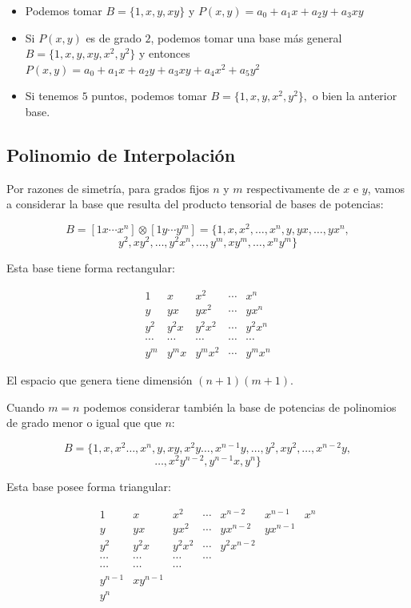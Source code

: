 \documentclass[twoside]{report}
\begin{document}
\begin{itemize}
\item Podemos tomar $B=\{1,x,y,xy\}$ y $P(x,y)=a_0+a_1x+a_2y+a_3xy$
\item Si $P(x,y)$ es de grado $2$, podemos tomar una base más general $B=\{1,x,y,xy,x^2,y^2\}$ y entonces $P(x,y)=a_0+a_1x+a_2y+a_3xy+a_4x^2+a_5y^2$
\item Si tenemos $5$ puntos, podemos tomar $B=\{1,x,y,x^2,y^2\},$ o bien la anterior base.
\end{itemize}

\subsection{Polinomio de Interpolación}

Por razones de simetría, para grados fijos $n$ y $m$ respectivamente de $x$ e $y$, vamos a considerar la base que resulta del producto tensorial de bases de potencias:

$$B=[1 x \cdots x^n]\otimes[1 y \cdots y^m]=\{1,x,x^2, \ldots, x^n, y, yx, \ldots,yx^n, $$ $$y^2, xy^2, \ldots, y^2x^n, \ldots,y^m,xy^m, \ldots,x^ny^m\}$$

Esta base tiene forma rectangular:

$$\begin{array}{ccccc}
1 & x & x^2& \cdots & x^n\\
y & yx& yx^2 & \cdots& y x^n\\
y^2 & y^2x& y^2x^2 & \cdots& y^2 x^n\\
\cdots & \cdots& \cdots&\cdots&\cdots\\
y^m & y^mx& y^mx^2 & \cdots& y^m x^n
\end{array}$$

El espacio que genera tiene dimensión $(n+1)(m+1)$.

Cuando $m=n$ podemos considerar también la  base de potencias de polinomios de grado menor o igual que que $n$:

$$B=\{1,x,x^2\ldots,x^n, y, xy, x^2y \ldots,x^{n-1}y,\ldots, y^2, xy^2,\ldots, x^{n-2}y,$$ $$\ldots, x^2y^{n-2}, y^{n-1}x,y^n \}$$

Esta base posee forma triangular:

$$\begin{array}{ccccccc}
1 & x & x^2& \cdots &x^{n-2}&x^{n-1}& x^n\\
y & yx& yx^2 & \cdots& yx^{n-2}& y x^{n-1} & \\
y^2 & y^2x& y^2x^2 & \cdots& y^2 x^{n-2} & & \\
\cdots & \cdots& \cdots&\cdots&& &  \\
\cdots & \cdots& \cdots& & & & \\
 y^{n-1} & xy^{n-1} &  & & & &\\
 y^n & & & & & &
\end{array}$$
\end{document}
